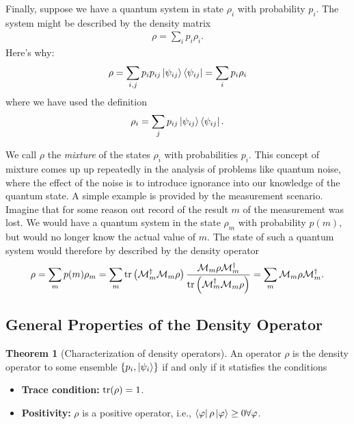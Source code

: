 \documentclass{book}
\theoremstyle{definition}
\newtheorem{thm}{Theorem}[section]
\newcommand{\M}{\mathcal{M}}
\newcommand{\f}[2]{\frac{#1}{#2}}
\newcommand{\lp}{\left(}
\newcommand{\rp}{\right)}
\begin{document}
Finally, suppose we have a quantum system in state $\rho_i$ with probability $p_i$. The system might be described by the density matrix
\begin{align}
\rho = \sum_i p_i \rho_i.
\end{align}
Here's why:
\begin{align}
\rho = \sum_{i,j}p_i p_{ij}\ket{\psi_{ij}}\bra{\psi_{ij}} = \sum_i p_i \rho_i
\end{align}
where we have used the definition
\begin{align}
\rho_i = \sum_{j}p_{ij}\ket{\psi_{ij}}\bra{\psi_{ij}}.
\end{align}

We call $\rho$ the \textit{mixture} of the states $\rho_i$ with probabilities $p_i$. This concept of mixture comes up up repeatedly in the analysis of problems like quantum noise, where the effect of the noise is to introduce ignorance into our knowledge of the quantum state. A simple example is provided by the measurement scenario. Imagine that for some reason out record of the result $m$ of the measurement was lost. We would have a quantum system in the state $\rho_m$ with probability $p(m)$, but would no longer know the actual value of $m$. The state of such a quantum system would therefore by described by the density operator
\begin{align}
\rho = \sum_m p(m)\rho_m = \sum_m \tr\lp \M_m^\dagger \M_m \rho \rp\f{\M_m \rho \M_m^\dagger}{\tr\lp \M_m^\dagger \M_m \rho \rp} = \sum_m \M_m \rho \M_m^\dagger.
\end{align}






























\subsection{General Properties of the Density Operator}



\begin{thm}[Characterization of density operators] 
	An operator $\rho$ is the density operator to some ensemble $\{p_i, \ket{\psi_i} \}$ if and only if it statisfies the conditions
	\begin{itemize}
		\item \textbf{Trace condition:} $\tr(\rho) = 1$.
		\item \textbf{Positivity:} $\rho$ is a positive operator, i.e., $\bra{\varphi}\rho\ket{\varphi} \geq 0 \forall \varphi$.
	\end{itemize}
\end{thm}
\end{document}
